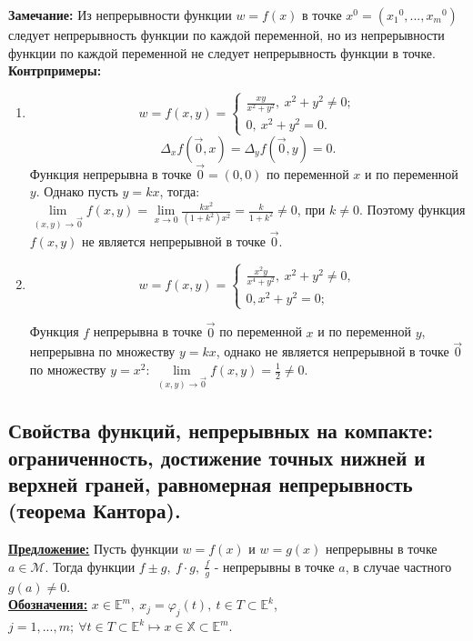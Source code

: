 \documentclass[a4paper,12pt]{article} %
\begin{document}
\textbf{Замечание:} Из непрерывности функции $w = f(x)$ в точке $x^0 = ({x_1}^0, ..., {x_m}^0)$ следует непрерывность функции по каждой переменной, но из непрерывности функции по каждой переменной не следует непрерывность функции в точке.\\

\textbf{Контрпримеры:}
\begin{enumerate}
	\item $$w = f(x, y) = 
		\begin{cases}
			\frac{xy}{x^2 + y^2}, ~ x^2 + y^2 \neq 0;
			\\0, ~ x^2 + y^2 = 0.
		\end{cases}
		$$
		$$\Delta_xf(\vec{0}, x) = \Delta_yf(\vec{0}, y) = 0.$$
		Функция непрерывна в точке $\vec{0} = (0, 0)$ по переменной $x$ и по переменной $y$.
		Однако пусть $y = kx$, тогда:
		\\[3mm]$\lim\limits_{(x, y) \to \vec{0}}f(x, y) = \lim\limits_{x \to 0}\frac{kx^2}{(1 + k^2)x^2} =
		\frac{k}{1+k^2} \neq 0$, при $k \neq 0$. Поэтому функция $f(x, y)$ не является непрерывной в точке $\vec{0}$.
	\item $$w = f(x, y) = 
		\begin{cases}
			\frac{x^2y}{x^4+y^2}, ~x^2 + y^2 \neq 0,
			\\0, x^2 + y^2 = 0;
		\end{cases}
		$$

Функция $f$ непрерывна в точке $\vec{0}$ по переменной $x$ и по переменной $y$, непрерывна по множеству $y = kx$, однако не является непрерывной в точке $\vec{0}$ по множеству $y = x^2$: $\lim\limits_{(x, y) \to \vec{0}}f(x, y) = \frac{1}{2} \neq 0$.
\end{enumerate}

\subsection{Свойства функций, непрерывных на компакте: ограниченность, достижение точных нижней и верхней граней, равномерная непрерывность (теорема Кантора).}
\underline{\textbf{Предложение:}} Пусть функции $w = f(x)$ и $w = g(x)$ непрерывны в точке $a \in \mathscr{M}$. Тогда функции $f \pm g, ~ f\cdot g, ~ \frac{f}{g} \text{ - непрерывны в точке } a$, 
в случае частного $g(a) \neq 0$.\\

\underline{\textbf{Обозначения:}} $x \in \mathbb{E}^m, ~ x_j = \varphi_j(t), ~t \in T \subset \mathbb{E}^k$,
$j = 1, ..., m;~\forall t \in T \subset \mathbb{E}^k \mapsto x \in \mathbb{X} \subset \mathbb{E}^m$.\\
\end{document}
